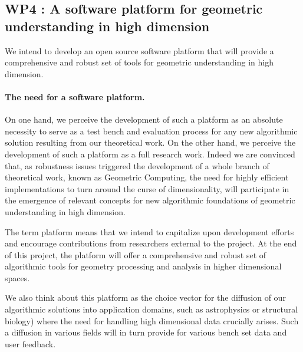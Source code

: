 
\subsection*{WP4 : A software platform for geometric understanding in high
  dimension}

We intend to develop an open source  software platform that will provide a
comprehensive and robust set of tools for geometric understanding in
high
dimension. 

\paragraph{The need for a software platform.}
On one hand, we perceive the development of such a platform as 
an absolute necessity to serve as a test bench and  evaluation process
for any new algorithmic solution resulting  from  our theoretical work.
On the other hand, we perceive the development of such a platform as
a full research work. Indeed we are convinced that, as robustness
issues triggered the development of a whole branch of theoretical
work, known as Geometric Computing, the need for
highly efficient implementations to turn around the curse of  
dimensionality,  will participate in the emergence of relevant
concepts for new algorithmic foundations
of  geometric understanding in high dimension.


The term platform means that we intend to capitalize upon development
efforts and encourage contributions from researchers external to the
project.  At the end of this project, the platform will offer a
comprehensive and robust set of algorithmic tools for geometry
processing and analysis in higher dimensional spaces.

We also think about this platform as the choice
vector for the diffusion of our algorithmic solutions 
into application domains, such as astrophysics
or structural biology) 
 where the need for handling high dimensional
data crucially arises.  Such a diffusion in various fields
 will in turn provide for various bench set data 
and user feedback.



